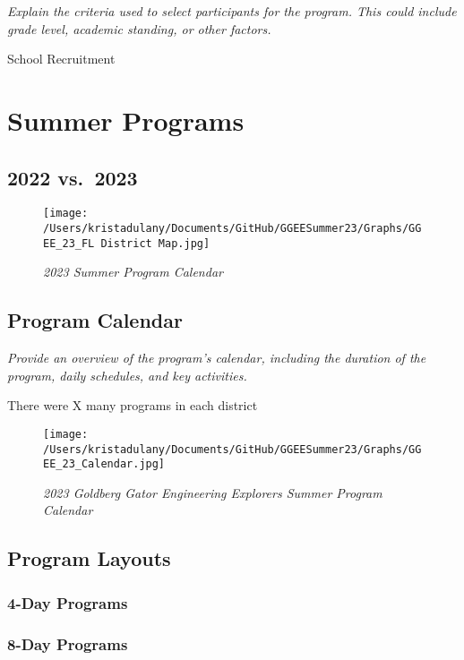 \documentclass[
]{article}
\begin{document}
\emph{Explain the criteria used to select participants for the program.
This could include grade level, academic standing, or other factors.}

School Recruitment

\hypertarget{summer-programs}{%
\section{Summer Programs}\label{summer-programs}}

\hypertarget{vs.-2023}{%
\subsection{2022 vs.~2023}\label{vs.-2023}}

\begin{figure}
\centering
\texttt{[image: /Users/kristadulany/Documents/GitHub/GGEESummer23/Graphs/GGEE\_23\_FL District Map.jpg]}
\caption{\emph{2023 Summer Program Calendar}}
\end{figure}

\hypertarget{program-calendar}{%
\subsection{Program Calendar}\label{program-calendar}}

\emph{Provide an overview of the program's calendar, including the
duration of the program, daily schedules, and key activities.}

There were X many programs in each district

\begin{figure}
\centering
\texttt{[image: /Users/kristadulany/Documents/GitHub/GGEESummer23/Graphs/GGEE\_23\_Calendar.jpg]}
\caption{\emph{2023 Goldberg Gator Engineering Explorers Summer Program
Calendar}}
\end{figure}

\hypertarget{program-layouts}{%
\subsection{Program Layouts}\label{program-layouts}}

\hypertarget{day-programs}{%
\subsubsection{4-Day Programs}\label{day-programs}}

\hypertarget{day-programs-1}{%
\subsubsection{8-Day Programs}\label{day-programs-1}}
\end{document}
